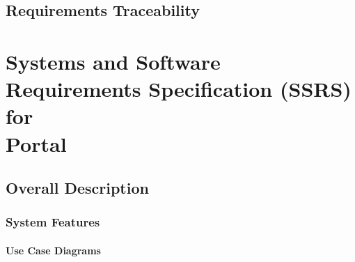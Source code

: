 \documentclass[12pt, oneside, letterpaper]{report}
\begin{document}
\chapter{Requirements Traceability}
		

\part{Systems and Software Requirements Specification (SSRS) \\ for \\ Portal}

\chapter{Overall Description}

\begin{comment}

	\section{Product Perspective}
		
	\section{Product Functions}
		
	\section{User Characteristics}
		
	\section{Constraints}
		
	\section{Assumptions and Dependencies}
		
	\section{System Level (Non-Functional) Requirements}
		
\chapter{Specific Requirements}
	\section{External Interface Requirements}
		

\end{comment}

	\section{System Features}
		\subsection{Use Case Diagrams}

\end{document}
